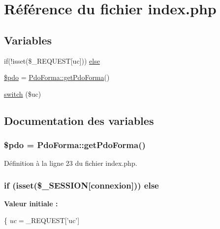\hypertarget{index_8php}{}\section{Référence du fichier index.\+php}
\label{index_8php}
\subsection*{Variables}
\begin{DoxyCompactItemize}
\item 
if(!isset(\$\+\_\+\+R\+E\+Q\+U\+E\+ST\mbox{[}\textquotesingle{}uc\textquotesingle{}\mbox{]})) \hyperlink{index_8php_a734287e5013019d7389b98b08541830d}{else}
\item 
\hyperlink{index_8php_a5766efd703cef0e00bfc06b3f3acbe0e}{\$pdo} = \hyperlink{class_pdo_forma_a601381ed4cb812a64d3ce4ea2afda54c}{Pdo\+Forma\+::get\+Pdo\+Forma}()
\item 
\hyperlink{index_8php_a6160ae6d9a60bbcc19780fa9bc2c9b41}{switch} (\$uc)
\end{DoxyCompactItemize}


\subsection{Documentation des variables}
\subsubsection[{\texorpdfstring{\$pdo}{$pdo}}]{\setlength{\rightskip}{0pt plus 5cm}\$pdo = {\bf Pdo\+Forma\+::get\+Pdo\+Forma}()}\hypertarget{index_8php_a5766efd703cef0e00bfc06b3f3acbe0e}{}\label{index_8php_a5766efd703cef0e00bfc06b3f3acbe0e}


Définition à la ligne 23 du fichier index.\+php.

\subsubsection[{\texorpdfstring{else}{else}}]{\setlength{\rightskip}{0pt plus 5cm}if (isset(\$\+\_\+\+S\+E\+S\+S\+I\+ON\mbox{[}\textquotesingle{}connexion\textquotesingle{}\mbox{]})) else}\hypertarget{index_8php_a734287e5013019d7389b98b08541830d}{}\label{index_8php_a734287e5013019d7389b98b08541830d}
{\bfseries Valeur initiale \+:}
\begin{DoxyCode}
\{
    $uc = $\_REQUEST[\textcolor{stringliteral}{'uc'}]
\end{DoxyCode}


